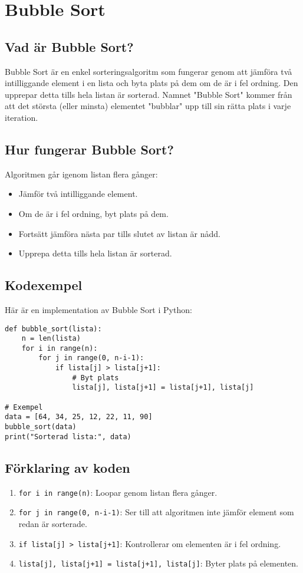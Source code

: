 \section{Bubble Sort}
\label{section:bubblesort}

\subsection*{Vad är Bubble Sort?}
Bubble Sort är en enkel sorteringsalgoritm som fungerar genom att jämföra två intilliggande element i en lista och byta plats på dem om de är i fel ordning. Den upprepar detta tills hela listan är sorterad. Namnet "Bubble Sort" kommer från att det största (eller minsta) elementet "bubblar" upp till sin rätta plats i varje iteration.

\subsection*{Hur fungerar Bubble Sort?}
Algoritmen går igenom listan flera gånger:
\begin{itemize}
    \item Jämför två intilliggande element.
    \item Om de är i fel ordning, byt plats på dem.
    \item Fortsätt jämföra nästa par tills slutet av listan är nådd.
    \item Upprepa detta tills hela listan är sorterad.
\end{itemize}

\subsection*{Kodexempel}
Här är en implementation av Bubble Sort i Python:
\begin{lstlisting}[title=Bubble Sort i Python]
def bubble_sort(lista):
    n = len(lista)
    for i in range(n):
        for j in range(0, n-i-1):
            if lista[j] > lista[j+1]:
                # Byt plats
                lista[j], lista[j+1] = lista[j+1], lista[j]

# Exempel
data = [64, 34, 25, 12, 22, 11, 90]
bubble_sort(data)
print("Sorterad lista:", data)
\end{lstlisting}

\subsection*{Förklaring av koden}
\begin{enumerate}
    \item \texttt{for i in range(n)}: Loopar genom listan flera gånger.
    \item \texttt{for j in range(0, n-i-1)}: Ser till att algoritmen inte jämför element som redan är sorterade.
    \item \texttt{if lista[j] > lista[j+1]}: Kontrollerar om elementen är i fel ordning.
    \item \texttt{lista[j], lista[j+1] = lista[j+1], lista[j]}: Byter plats på elementen.
\end{enumerate}

